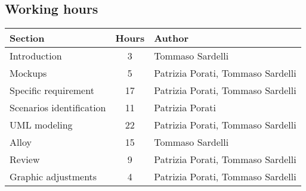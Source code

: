 \subsection{Working hours}

\begin{center}
	\vspace{0.2cm}
	\begin{tabular}{ l c l } 
		\hline
		Section 					& Hours & Author \\ 
		\hline
		Introduction				& 3 	& Tommaso Sardelli	\\
		Mockups     				& 5 	& Patrizia Porati, Tommaso Sardelli	\\
		Specific requirement 		& 17 	& Patrizia Porati, Tommaso Sardelli \\ 
		Scenarios identification	& 11 	& Patrizia Porati	\\
		UML modeling				& 22	& Patrizia Porati, Tommaso Sardelli	\\
		Alloy						& 15	& Tommaso Sardelli 	\\
		Review						& 9		& Patrizia Porati, Tommaso Sardelli	\\
		Graphic adjustments         & 4		& Patrizia Porati, Tommaso Sardelli	\\
		\hline
	\end{tabular}
\end{center}
